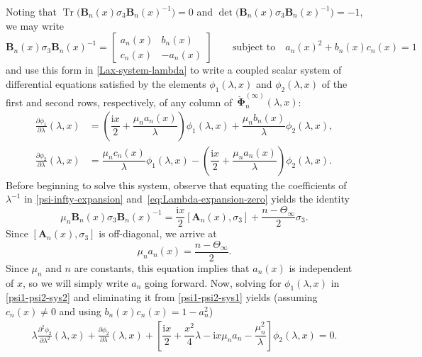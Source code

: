 \documentclass[11pt]{article}
\numberwithin{equation}{section}
\numberwithin{equation}{section}
\newcommand{\ii}{\mathrm{i}}
\newcommand{\para}[1]{\breve{#1}}
\newcommand{\Tr}{\operatorname{Tr}}
\begin{document}
Noting that $\Tr\big(\mathbf{B}_{n}(x)\sigma_3\mathbf{B}_{n}(x)^{-1}\big)=0$ and $\det \big(\mathbf{B}_{n}(x) \sigma_3 \mathbf{B}_{n}(x)^{-1}\big) = -1$, we may write
\begin{equation}
\mathbf{B}_{n}(x) \sigma_3 \mathbf{B}_{n}(x)^{-1} = \begin{bmatrix} a_n(x) & b_n(x) \\ c_n(x) & -a_n(x) \end{bmatrix} \qquad \text{subject to}\quad a_n(x)^2 + b_n(x)c_n(x) = 1
\label{eq:zero-coefficient-matrix}
\end{equation}
and use this form in \eqref{Lax-system-lambda} to write a coupled scalar system of differential equations satisfied by the elements $\phi_1(\lambda,x)$ and $\phi_2(\lambda,x)$ of the first and second rows, respectively, of any column of~$\para{\boldsymbol \Phi}_n^{(\infty)}(\lambda,x)$:
\begin{align}
\label{psi1-psi2-sys1} \frac{\partial\phi_{1}}{\partial\lambda}(\lambda,x) &= \left(\dfrac{\ii x}{2} + \dfrac{\mu_n a_n(x)}{\lambda}\right) \phi_1(\lambda,x) + \dfrac{\mu_n b_n(x)}{\lambda} \phi_2(\lambda,x), \\
\label{psi1-psi2-sys2} \frac{\partial\phi_{2}}{\partial\lambda}(\lambda,x) &= \dfrac{\mu_n c_n(x)}{\lambda} \phi_1(\lambda,x)-\left(\dfrac{\ii x}{2}+ \dfrac{\mu_n a_n(x)}{\lambda}\right) \phi_2(\lambda,x).
\end{align}
Before beginning to solve this system, observe that equating the coefficients of $\lambda^{-1}$ in \eqref{psi-infty-expansion} and~\eqref{eq:Lambda-expansion-zero} yields the identity
\begin{equation}
\label{C-A relation}
\mu_n \mathbf{B}_{n}(x) \sigma_3 \mathbf{B}_{n}(x)^{-1} = \dfrac{\ii x}{2} [\mathbf{A}_{n}(x), \sigma_3] + \dfrac{n - \Theta_\infty}{2} \sigma_3.
\end{equation}
Since $[\mathbf{A}_{n}(x), \sigma_3]$ is off-diagonal, we arrive at
\begin{equation}
\mu_n a_n(x) = \frac{n - \Theta_\infty}{2}.
\label{eq:little-an}
\end{equation}
Since $\mu_n$ and $n$ are constants, this equation implies that $a_n(x)$ is independent of $x$, so we will simply write $a_n$ going forward.
Now, solving for $\phi_1(\lambda,x)$ in \eqref{psi1-psi2-sys2} and eliminating it from \eqref{psi1-psi2-sys1} yields (assuming $c_n(x) \neq 0$ and using $b_n(x)c_n(x) = 1 - a_n^2$)
\begin{align*}
 \lambda \frac{\partial^2\phi_{2}}{\partial\lambda^2}(\lambda,x) + \frac{\partial\phi_{2}}{\partial\lambda}(\lambda,x) + \left[ \dfrac{\ii x}{2} + \dfrac{x^2}{4} \lambda - \ii x\mu_n a_n - \dfrac{\mu_n^2}{\lambda} \right]\phi_2(\lambda,x) = 0.
\end{align*}
\end{document}
